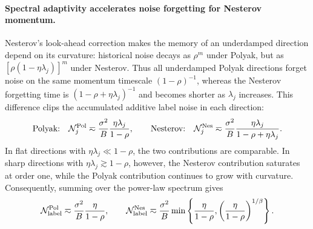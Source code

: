\documentclass[11pt]{article}
\begin{document}
\paragraph{Spectral adaptivity accelerates noise forgetting for Nesterov momentum.}
Nesterov's look-ahead correction makes the memory of an underdamped direction depend on its curvature: historical noise decays as \(\rho^m\) under Polyak, but as \([\rho(1-\eta\lambda_j)]^m\) under Nesterov. Thus all underdamped Polyak directions forget noise on the same momentum timescale \((1-\rho)^{-1}\), whereas the Nesterov forgetting time is \((1-\rho+\eta\lambda_j)^{-1}\) and becomes shorter as \(\lambda_j\) increases. This difference clips the accumulated additive label noise in each direction:
\[
\textnormal{Polyak:}\quad
\mathcal{N}_j^{\rm Pol}\eqsim\frac{\sigma^2}{B}\frac{\eta\lambda_j}{1-\rho},
\qquad
\textnormal{Nesterov:}\quad
\mathcal{N}_j^{\rm Nes}\eqsim\frac{\sigma^2}{B}\frac{\eta\lambda_j}{1-\rho+\eta\lambda_j}.
\]
In flat directions with \(\eta\lambda_j\ll1-\rho\), the two contributions are comparable. In sharp directions with \(\eta\lambda_j\gtrsim1-\rho\), however, the Nesterov contribution saturates at order one, while the Polyak contribution continues to grow with curvature. Consequently, summing over the power-law spectrum gives
\[
\mathcal{N}_{\rm label}^{\rm Pol}
\eqsim
\frac{\sigma^2}{B}\frac{\eta}{1-\rho},
\qquad
\mathcal{N}_{\rm label}^{\rm Nes}
\eqsim
\frac{\sigma^2}{B}
\min\left\{
\frac{\eta}{1-\rho},
\left(\frac{\eta}{1-\rho}\right)^{1/\beta}
\right\}.
\]


\end{document}
